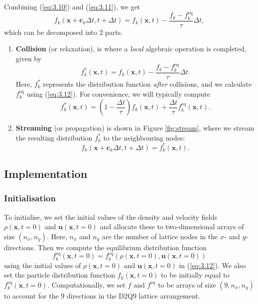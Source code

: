 \documentclass[a4paper, 11pt]{report}
\begin{document}
Combining (\ref{eq:3.10}) and (\ref{eq:3.11}), we get
\begin{equation}
    f_k(\mathbf{x} + \mathbf{c}_k\Delta t, t + \Delta t) = f_k(\mathbf{x}, t) -\frac{f_k - f_k^{\mathrm{eq}}}{\tau}\Delta t, \label{eq:3.13}
\end{equation}
which can be decomposed into 2 parts.

\begin{enumerate}
    \item \textbf{Collision} (or relaxation), is where a \emph{local} algebraic operation is completed, given by
    \begin{equation}
        f_k^*(\mathbf{x},t) = f_k(\mathbf{x}, t) -\frac{f_k - f_k^{\mathrm{eq}}}{\tau}\Delta t. \label{eq:3.14}
    \end{equation}
    Here, $f_k^*$ represents the distribution function \emph{after} collisions, and we calculate $f_k^{\mathrm{eq}}$ using (\ref{eq:3.12}). For convenience, we will typically compute
    \begin{equation}
        f_k^*(\mathbf{x},t) = \left(1-\frac{\Delta t}{\tau}\right)f_k(\mathbf{x}, t) + \frac{\Delta t}{\tau}f_k^{\mathrm{eq}}(\mathbf{x},t). \label{eq:3.15}
    \end{equation}
    \item \textbf{Streaming} (or propagation) is shown in Figure \ref{fig:stream}, where we stream the resulting distribution $f_k^*$ to the neighbouring nodes:
    \begin{equation}
        f_k(\mathbf{x} + \mathbf{c}_k\Delta t, t + \Delta t) = f_k^*(\mathbf{x},t). \label{eq:3.16}
    \end{equation}
\end{enumerate}

\subsection{Implementation}
\subsubsection{Initialisation}
To initialise, we set the initial values of the density and velocity fields $\rho(\mathbf{x},t=0)$ and $\mathbf{u}(\mathbf{x},t=0)$ and allocate these to two-dimensional arrays of size $(n_x, n_y)$. Here, $n_x$ and $n_y$ are the number of lattice nodes in the $x$- and $y$- directions. Then we compute the equilibrium distribution function $$f_k^{\mathrm{eq}}(\mathbf{x},t=0) = f_k^{\mathrm{eq}}\left(\rho(\mathbf{x},t=0),\mathbf{u}(\mathbf{x},t=0)\right)$$ using the initial values of $\rho(\mathbf{x},t=0)$ and $\mathbf{u}(\mathbf{x},t=0)$ in (\ref{eq:3.12}). We also set the particle distribution function $f_k(\mathbf{x},t=0)$ to be initially equal to $f_k^{\mathrm{eq}}(\mathbf{x},t=0)$. Computationally, we set $f$ and $f^{\mathrm{eq}}$ to be arrays of size $(9, n_x, n_y)$ to account for the 9 directions in the D2Q9 lattice arrangement.   
\end{document}
